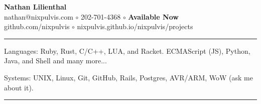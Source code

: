 \documentclass[10pt,letterpaper]{article}
\newenvironment{indentsection}[1]
{\begin{list}{}
  {\setlength{\leftmargin}{#1}} \item[]
}
{\end{list}}
\begin{document}
\begin{center}
  \huge \textbf{Nathan Lilienthal} \\
  \large
  nathan@nixpulvis.com
  $\circ$
  202-701-4368
  $\circ$
  {\bf Available Now}
  \\
  github.com/nixpulvis
  $\circ$
  nixpulvis.github.io/nixpulvis/projects
  \vspace{-0.2em}
\end{center}


\hrule
\begin{indentsection}{\parindent}
\begin{description*}
  \item[Languages:] Ruby, Rust, C/C++, LUA, and Racket. ECMAScript (JS),
    Python, Java, and Shell and many more...
  \item[Systems:] UNIX, Linux, Git, GitHub, Rails, Postgres, AVR/ARM, WoW
    (ask me about it).
\end{description*}
\end{indentsection}


\hrule
\vspace{-0.4em}
\end{document}
